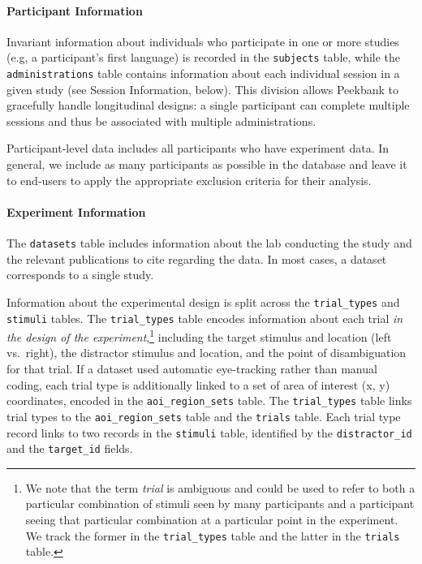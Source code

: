 \documentclass[
  english,
  man,floatsintext]{apa6}
\let\oldparagraph\paragraph
\renewcommand{\paragraph}[1]{\oldparagraph{#1}\mbox{}}
\providecommand{\DIFaddtex}[1]{{\protect\color{blue}{#1}}} %
\providecommand{\DIFdeltex}[1]{}                      %
\providecommand{\DIFaddbegin}{} %
\providecommand{\DIFaddend}{} %
\providecommand{\DIFdelbegin}{} %
\providecommand{\DIFdelend}{} %
\providecommand{\DIFadd}[1]{\texorpdfstring{\DIFaddtex{#1}}{#1}} %
\providecommand{\DIFdel}[1]{\texorpdfstring{\DIFdeltex{#1}}{}} %
\newcommand{\DIFscaledelfig}{0.5}
\newlength{\DIFdelgraphicswidth} %
\newlength{\DIFdelgraphicsheight} %
\newcommand{\DIFaddincludegraphics}[2][]{{\color{blue}\fbox{\DIFOincludegraphics[#1]{#2}}}} %
\newcommand{\DIFdelincludegraphics}[2][]{%
\sbox{\DIFdelgraphicsbox}{\DIFOincludegraphics[#1]{#2}}%
\settoboxwidth{\DIFdelgraphicswidth}{\DIFdelgraphicsbox} %
\settoboxtotalheight{\DIFdelgraphicsheight}{\DIFdelgraphicsbox} %
\scalebox{\DIFscaledelfig}{%
\parbox[b]{\DIFdelgraphicswidth}{\usebox{\DIFdelgraphicsbox}\\[-\baselineskip] \rule{\DIFdelgraphicswidth}{0em}}\llap{\resizebox{\DIFdelgraphicswidth}{\DIFdelgraphicsheight}{%
\setlength{\unitlength}{\DIFdelgraphicswidth}%
\begin{picture}(1,1)%
\thicklines\linethickness{2pt} %
{\color[rgb]{1,0,0}\put(0,0){\framebox(1,1){}}}%
{\color[rgb]{1,0,0}\put(0,0){\line( 1,1){1}}}%
{\color[rgb]{1,0,0}\put(0,1){\line(1,-1){1}}}%
\end{picture}%
}\hspace*{3pt}}} %
} %
\DeclareRobustCommand{\DIFaddbegin}{\DIFOaddbegin \let\includegraphics\DIFaddincludegraphics} %
\DeclareRobustCommand{\DIFaddend}{\DIFOaddend \let\includegraphics\DIFOincludegraphics} %
\DeclareRobustCommand{\DIFdelbegin}{\DIFOdelbegin \let\includegraphics\DIFdelincludegraphics} %
\DeclareRobustCommand{\DIFdelend}{\DIFOaddend \let\includegraphics\DIFOincludegraphics} %
\begin{document}
\hypertarget{participant-information}{%
\paragraph{Participant Information}\label{participant-information}}

\DIFaddbegin \DIFadd{All information about individual participants in Peekbank is completely de-identified under United States law, containing none of the key identifiers listed under the ``Safe Harbor'' standard for data de-identification.
All participant-level linkages are made using anonymous participant identifiers.
}

\DIFaddend Invariant information about individuals who participate in one or more studies (e.g, a participant's first language) is recorded in the \texttt{subjects} table, while the \texttt{administrations} table contains information about each individual session in a given study (see Session Information, below).
This division allows Peekbank to gracefully handle longitudinal designs: a single participant can complete multiple sessions and thus be associated with multiple administrations.

Participant-level data includes all participants who have experiment data.
In general, we include as many participants as possible in the database and leave it to end-users to apply the appropriate exclusion criteria for their analysis.

\hypertarget{experiment-information}{%
\paragraph{Experiment Information}\label{experiment-information}}

The \texttt{datasets} table includes information about the lab conducting the study and the relevant publications to cite regarding the data.
In most cases, a dataset corresponds to a single study.

Information about the experimental design is split across the \texttt{trial\_types} and \texttt{stimuli} tables.
The \texttt{trial\_types} table encodes information about each trial \textit{in the design of the experiment},\footnote{We note that the term \textit{trial} is ambiguous and could be used to refer to both a particular combination of stimuli seen by many participants and a participant seeing that particular combination at a particular point in the experiment. We track the former in the \texttt{trial\_types} table and the latter in the \texttt{trials} table.} including the target stimulus and location (left vs.~right), the distractor stimulus and location, and the point of disambiguation for that trial.
If a dataset used automatic eye-tracking rather than manual coding, each trial type is additionally linked to a set of area of interest (x, y) coordinates, encoded in the \texttt{aoi\_region\_sets} table.
The \texttt{trial\_types} table links trial types to the \texttt{aoi\_region\_sets} table and the \texttt{trials} table.
Each trial \DIFdelbegin \DIFdel{\_}\DIFdelend type record links to two records in the \texttt{stimuli} table, identified by the \texttt{distractor\_id} and the \texttt{target\_id} fields.
\end{document}
